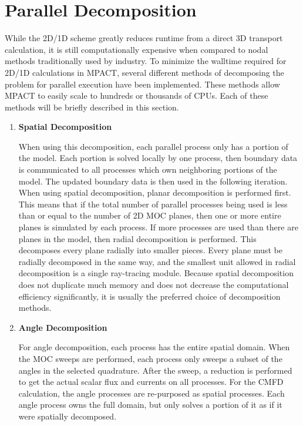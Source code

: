 \section{Parallel Decomposition}

While the 2D/1D scheme greatly reduces runtime from a direct 3D transport calculation, it is still computationally expensive when compared to nodal methods traditionally used by industry.  To minimize the walltime required for 2D/1D calculations in MPACT, several different methods of decomposing the problem for parallel execution have been implemented.  These methods allow MPACT to easily scale to hundreds or thousands of CPUs.  Each of these methods will be briefly described in this section.

\begin{enumerate}[leftmargin=*]
\item \textbf{Spatial Decomposition}

When using this decomposition, each parallel process only has a portion of the model.  Each portion is solved locally by one process, then boundary data is communicated to all processes which own neighboring portions of the model.  The updated boundary data is then used in the following iteration.  When using spatial decomposition, planar decomposition is performed first.  This means that if the total number of parallel processes being used is less than or equal to the number of 2D MOC planes, then one or more entire planes is simulated by each process.  If more processes are used than there are planes in the model, then radial decomposition is performed.  This decomposes every plane radially into smaller pieces.  Every plane must be radially decomposed in the same way, and the smallest unit allowed in radial decomposition is a single ray-tracing module.  Because spatial decomposition does not duplicate much memory and does not decrease the computational efficiency significantly, it is usually the preferred choice of decomposition methods.

\item \textbf{Angle Decomposition}

For angle decomposition, each process has the entire spatial domain.  When the MOC sweeps are performed, each process only sweeps a subset of the angles in the selected quadrature.  After the sweep, a reduction is performed to get the actual scalar flux and currents on all processes.  For the CMFD calculation, the angle processes are re-purposed as spatial processes.  Each angle process owns the full domain, but only solves a portion of it as if it were spatially decomposed.


\end{enumerate}
